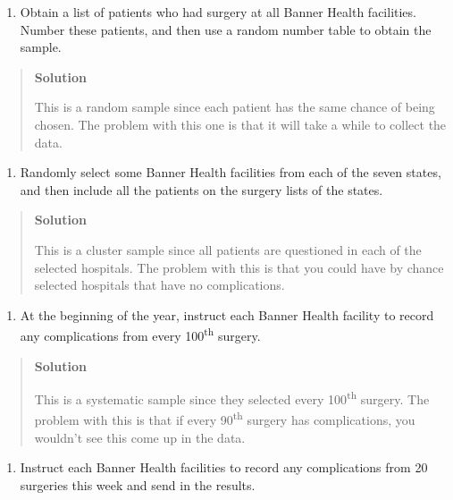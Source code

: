 \documentclass[]{book}
\providecommand{\tightlist}{%
  \setlength{\itemsep}{0pt}\setlength{\parskip}{0pt}}
\begin{document}
\begin{enumerate}
\def\labelenumi{\alph{enumi}.}
\setcounter{enumi}{1}
\tightlist
\item
  Obtain a list of patients who had surgery at all Banner Health
  facilities. Number these patients, and then use a random number
  table to obtain the sample.
\end{enumerate}

\begin{quote}
\textbf{Solution}

This is a random sample since each patient has the same chance of being chosen. The problem with this one is that it will take a while to collect the data.
\end{quote}

\begin{enumerate}
\def\labelenumi{\alph{enumi}.}
\setcounter{enumi}{2}
\tightlist
\item
  Randomly select some Banner Health facilities from each of the seven states, and then include all the patients on the surgery lists of the states.
\end{enumerate}

\begin{quote}
\textbf{Solution}

This is a cluster sample since all patients are questioned in each of the selected hospitals. The problem with this is that you could have by chance selected hospitals that have no complications.
\end{quote}

\begin{enumerate}
\def\labelenumi{\alph{enumi}.}
\setcounter{enumi}{3}
\tightlist
\item
  At the beginning of the year, instruct each Banner Health facility to record any complications from every 100\textsuperscript{th} surgery.
\end{enumerate}

\begin{quote}
\textbf{Solution}

This is a systematic sample since they selected every 100\textsuperscript{th} surgery. The problem with this is that if every 90\textsuperscript{th} surgery has complications, you wouldn't see this come up in the data.
\end{quote}

\begin{enumerate}
\def\labelenumi{\alph{enumi}.}
\setcounter{enumi}{4}
\tightlist
\item
  Instruct each Banner Health facilities to record any complications from 20 surgeries this week and send in the results.
\end{enumerate}
\end{document}
